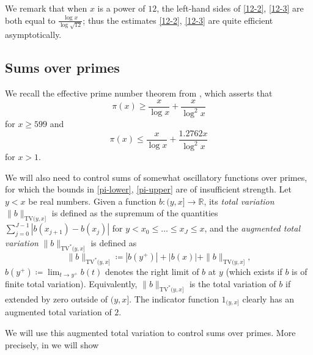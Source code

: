\documentclass[12pt,a4paper,reqno]{amsart}
\numberwithin{equation}{section}
\theoremstyle{plain}
\theoremstyle{definition}
\newcommand\R{\mathbb{R}}
\begin{document}
We remark that when $x$ is a power of $12$, the left-hand sides of \eqref{12-2}, \eqref{12-3} are both equal to $\frac{\log x}{\log \sqrt{12}}$; thus the estimates \eqref{12-2}, \eqref{12-3} are quite efficient asymptotically.

\subsection{Sums over primes}

We recall the effective prime number theorem from \cite[Corollary 5.2]{dusart}, which asserts that
\begin{equation}\label{pi-lower}
  \pi(x) \geq \frac{x}{\log x} + \frac{x}{\log^2 x}
\end{equation}
for $x \geq 599$ and
\begin{equation}\label{pi-upper}
  \pi(x) \leq \frac{x}{\log x} + \frac{1.2762 x}{\log^2 x}
\end{equation}
for $x >1$.  

We will also need to control sums of somewhat oscillatory functions over primes, for which the bounds in \eqref{pi-lower}, \eqref{pi-upper} are of insufficient strength. Let $y<x$ be real numbers. Given a function $b \colon (y,x] \to \R$, its \emph{total variation}
$\|b\|_{\mathrm{TV}(y,x]}$ is defined as the supremum of the quantities $\sum_{j=0}^{J-1} |b(x_{j+1})-b(x_j)|$ for $y < x_0 \leq \dots \leq x_J \leq x$, and the \emph{augmented total variation} $\|b\|_{\mathrm{TV}^*(y,x]}$ is defined as
$$
\|b\|_{\mathrm{TV}^*(y,x]}
\coloneqq |b(y^+)| + |b(x)| + \|b\|_{\mathrm{TV}(y,x]},$$
$b(y^+) \coloneqq \lim_{t \to y^+} b(t)$ denotes the right limit of $b$ at $y$ (which exists if $b$ is of finite total variation).  Equivalently, $\|b\|_{\mathrm{TV}^*(y,x]}$ is the total variation of $b$ if extended by zero outside of $(y,x]$. The indicator function $1_{(y,x]}$ clearly has an augmented total variation of $2$.

We will use this augmented total variation to control sums over primes.  More precisely, in  we will show
\end{document}
